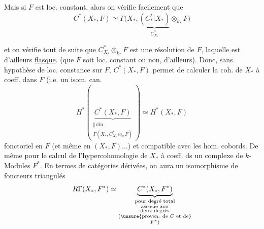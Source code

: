 
Mais si $F$ est loc. constant, alors on vérifie facilement que
\[
C^*(X_*,F)\simeq
\Gamma\bigl(X_*,\underbrace{(C_*^*|X_*)}_{C_{X_*}^*}\otimes_{k_*}F\bigr)
\]

et on vérifie tout de suite que $C_{X_*}^*\otimes_{k_*}F$ est une résolution de $F$, laquelle est d'ailleurs \uline{flasque}.  (que $F$ soit loc. constant ou non, d'ailleurs). Donc, sans hypothèse de loc. constance sur $F$, $C^*(X_*,F)$ permet de calculer la coh. de $X_*$ à coeff. dans $F$ (i.e.  un isom. can.
\[
H^*\left(
\underbrace{C^*(X_*,F)}_{
\substack{\Vert\,\mathrm{dfn}\\\Gamma(X_*,C_{X_*}^*\otimes_kF)}
}
\right)\simeq H^*(X_*,F)
\]
  fonctoriel en $F$ (et même en $(X_*,F)\ldots$) et compatible avec les hom. cobords. De même pour le calcul de l'hypercohomologie de $X_*$ à coeff. ds un complexe de $k$-Modules $F^*$. En termes de catégories dérivées, on aura un isomorphisme de foncteurs triangulés
\[
R\Gamma(X_*,F^*)\simeq
\underbrace{C^*(X_*,F^*)}_{
\substack{\text{pour degré total}\\
\text{associé aux}\\
\text{deux degrés}\\
(\unsure{\text{proven. de }C\text{ et de}}\\F^*)}}
\]
